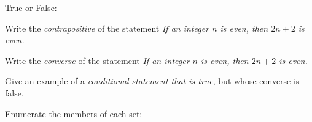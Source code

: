 \documentclass[12pt,fleqn]{exam}
\begin{document}
\newpage
\begin{questions}

\question True or False:

 
 \question [10] Write the \emph{contrapositive} of the statement
    \emph{If an integer $n$ is even, then $2 n +  2$ is even.}
\begin{solution}[2.2in]
\end{solution}

 \question [10] Write the \emph{converse} of the statement
 \emph{If an integer $n$ is even, then $2 n +  2$ is even.}
\begin{solution}[2.2in]
\end{solution}

\question [10] Give an example of a \emph{conditional statement that is true}, but whose converse is false.
\begin{solution}%
\end{solution}
 
 \newpage
\question Enumerate the members of each set:

\end{questions}
\end{document}
